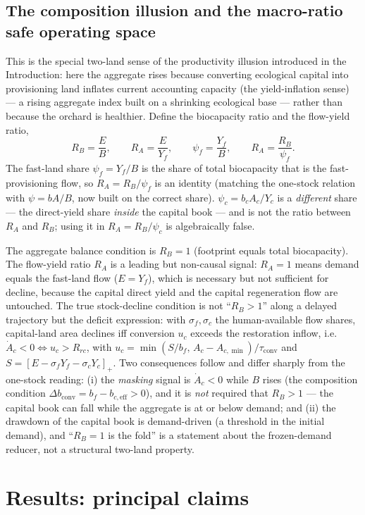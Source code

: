 \documentclass[11pt]{article}
\begin{document}
\subsection{The composition illusion and the macro-ratio safe operating space}

This is the special two-land sense of the productivity illusion introduced in the Introduction: here the aggregate rises because converting ecological capital into provisioning land inflates current accounting capacity (the yield-inflation sense) --- a rising aggregate index built on a shrinking ecological base --- rather than because the orchard is healthier. Define the biocapacity ratio and the flow-yield ratio,
\[
R_B=\frac{E}{B},\qquad R_A=\frac{E}{Y_f},\qquad \psi_f=\frac{Y_f}{B},\qquad R_A=\frac{R_B}{\psi_f}.
\]
\noindent The fast-land share $\psi_f=Y_f/B$ is the share of total biocapacity that is the fast-provisioning flow, so $R_A=R_B/\psi_f$ is an identity (matching the one-stock relation with $\psi=bA/B$, now built on the correct share). $\psi_c=b_cA_c/Y_c$ is a \emph{different} share --- the direct-yield share \emph{inside} the capital book --- and is not the ratio between $R_A$ and $R_B$; using it in $R_A=R_B/\psi_c$ is algebraically false.
\par The aggregate balance condition is $R_B=1$ (footprint equals total biocapacity). The flow-yield ratio $R_A$ is a leading but non-causal signal: $R_A=1$ means demand equals the fast-land flow ($E=Y_f$), which is necessary but not sufficient for decline, because the capital direct yield and the capital regeneration flow are untouched. The true stock-decline condition is not ``$R_B>1$'' along a delayed trajectory but the deficit expression: with $\sigma_f,\sigma_c$ the human-available flow shares, capital-land area declines iff conversion $u_c$ exceeds the restoration inflow, i.e.\ $\dot A_c<0\iff u_c>R_{rc}$, with $u_c=\min(S/b_f,\,A_c-A_{c,\min})/\tau_{\mathrm{conv}}$ and $S=[E-\sigma_fY_f-\sigma_cY_c]_+$. Two consequences follow and differ sharply from the one-stock reading: (i) the \emph{masking} signal is $\dot A_c<0$ while $B$ rises (the composition condition $\Delta b_{\mathrm{conv}}=b_f-b_{c,\mathrm{eff}}>0$), and it is \emph{not} required that $R_B>1$ --- the capital book can fall while the aggregate is at or below demand; and (ii) the drawdown of the capital book is demand-driven (a threshold in the initial demand), and ``$R_B=1$ is the fold'' is a statement about the frozen-demand reducer, not a structural two-land property.

\section{Results: principal claims}
\end{document}
